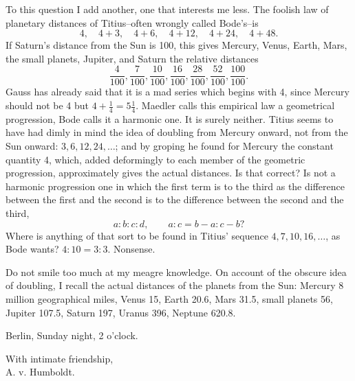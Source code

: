 \documentclass[11pt]{article}
\newcommand{\sign}[1]{\begin{flushright}#1\end{flushright}}
\begin{document}
To this question I add another, one that interests me less. The foolish law of planetary distances of Titius--often wrongly called Bode's--is
\[
4,
\quad 4+3,
\quad 4+6,
\quad 4+12,
\quad 4+24,
\quad 4+48.
\]
If Saturn's distance from the Sun is 100, this gives Mercury, Venus, Earth, Mars, the small planets, Jupiter, and Saturn the relative distances
\[
\frac4{100},\frac7{100},\frac{10}{100},\frac{16}{100},\frac{28}{100},\frac{52}{100},\frac{100}{100}.
\]
Gauss has already said that it is a mad series which begins with 4, since Mercury should not be 4 but \(4+\frac14=5\frac14\). Maedler calls this empirical law a geometrical progression, Bode calls it a harmonic one. It is surely neither. Titius seems to have had dimly in mind the idea of doubling from Mercury onward, not from the Sun onward: \(3,6,12,24,\ldots\); and by groping he found for Mercury the constant quantity 4, which, added deformingly to each member of the geometric progression, approximately gives the actual distances. Is that correct? Is not a harmonic progression one in which the first term is to the third as the difference between the first and the second is to the difference between the second and the third,
\[
 a:b:c:d,
 \qquad a:c=b-a:c-b?
\]
Where is anything of that sort to be found in Titius' sequence \(4,7,10,16,\ldots\), as Bode wants? \(4:10=3:3\). Nonsense.

Do not smile too much at my meagre knowledge. On account of the obscure idea of doubling, I recall the actual distances of the planets from the Sun: Mercury 8 million geographical miles, Venus 15, Earth 20.6, Mars 31.5, small planets 56, Jupiter 107.5, Saturn 197, Uranus 396, Neptune 620.8.

Berlin, Sunday night, 2 o'clock. \sign{With intimate friendship,\\ A. v. Humboldt.}
\end{document}
